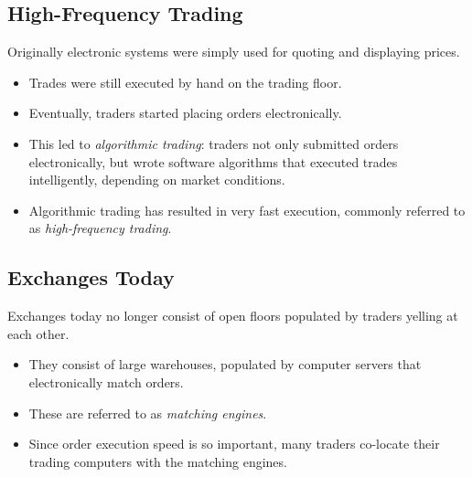 \documentclass[letterpaper,10pt,english]{sphinxmanual}
\begin{document}
\subsection{High-Frequency Trading}
\label{trading:high-frequency-trading}
Originally electronic systems were simply used for quoting and
displaying prices.
\begin{itemize}
\item {} 
Trades were still executed by hand on the trading floor.

\end{itemize}
\begin{itemize}
\item {} 
Eventually, traders started placing orders electronically.

\end{itemize}
\begin{itemize}
\item {} 
This led to \emph{algorithmic trading}: traders not only submitted
orders electronically, but wrote software algorithms that
executed trades intelligently, depending on market conditions.

\end{itemize}
\begin{itemize}
\item {} 
Algorithmic trading has resulted in very fast execution, commonly
referred to as \emph{high-frequency trading}.

\end{itemize}


\subsection{Exchanges Today}
\label{trading:exchanges-today}
Exchanges today no longer consist of open floors populated by traders
yelling at each other.
\begin{itemize}
\item {} 
They consist of large warehouses, populated by computer servers
that electronically match orders.

\end{itemize}
\begin{itemize}
\item {} 
These are referred to as \emph{matching engines}.

\end{itemize}
\begin{itemize}
\item {} 
Since order execution speed is so important, many traders co-locate
their trading computers with the matching engines.

\end{itemize}
\end{document}
